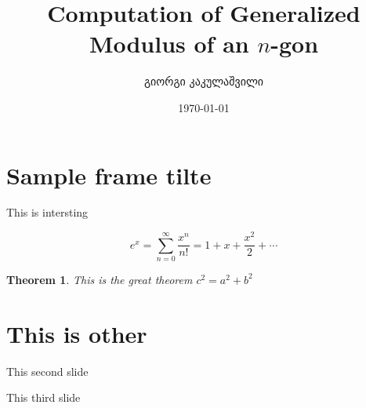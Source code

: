 \documentclass[12pt]{article}
\newcommand{\slidetitle}[1]{\section*{#1}}
\newtheorem{theorem}{Theorem}
\newenvironment{slide}[1]{\newpage #1}{\vfill\rightline{\thepage}}
\begin{document}
\title{\Large\color{primary} Computation of Generalized Modulus of an $n$-gon}
\author{\normalsize გიორგი კაკულაშვილი}
\date{\normalsize \today}
\maketitle




\begin{slide}
    \slidetitle{Sample frame tilte}

    This is intersting

    \[
        e^x = \sum_{n=0}^{\infty} \frac{x^n}{n!} = 1 + x + \frac{x^2}{2} + \cdots
    \]

    \begin{theorem}
        This is the great theorem $c^2=a^2+b^2$
    \end{theorem}

\end{slide}


\begin{slide}
    \slidetitle{This is other}
    This second slide 
    
\end{slide}

\begin{slide}
    This third slide
\end{slide}
\end{document}
